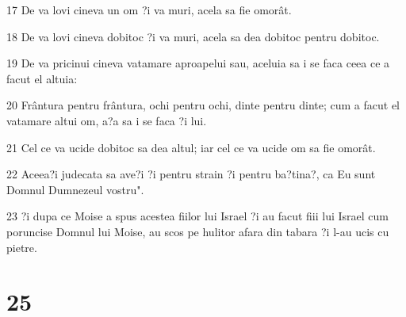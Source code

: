 \par 17 De va lovi cineva un om ?i va muri, acela sa fie omorât.
\par 18 De va lovi cineva dobitoc ?i va muri, acela sa dea dobitoc pentru dobitoc.
\par 19 De va pricinui cineva vatamare aproapelui sau, aceluia sa i se faca ceea ce a facut el altuia:
\par 20 Frântura pentru frântura, ochi pentru ochi, dinte pentru dinte; cum a facut el vatamare altui om, a?a sa i se faca ?i lui.
\par 21 Cel ce va ucide dobitoc sa dea altul; iar cel ce va ucide om sa fie omorât.
\par 22 Aceea?i judecata sa ave?i ?i pentru strain ?i pentru ba?tina?, ca Eu sunt Domnul Dumnezeul vostru".
\par 23 ?i dupa ce Moise a spus acestea fiilor lui Israel ?i au facut fiii lui Israel cum poruncise Domnul lui Moise, au scos pe hulitor afara din tabara ?i l-au ucis cu pietre.

\chapter{25}


